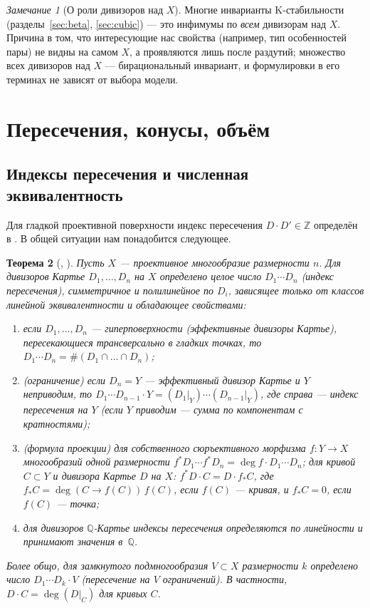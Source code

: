\documentclass[11pt,a4paper]{article}
\theoremstyle{plain}
\newtheorem{theorem}{Теорема}[section]
\theoremstyle{definition}
\theoremstyle{remark}
\newtheorem{remark}[theorem]{Замечание}
\newcommand{\Z}{\mathbb{Z}}
\newcommand{\Q}{\mathbb{Q}}
\begin{document}
\begin{remark}[О роли дивизоров над $X$]
Многие инварианты K-стабильности (разделы~\ref{sec:beta}, \ref{sec:cubic}) --- это инфимумы по
\emph{всем} дивизорам над $X$. Причина в том, что интересующие нас свойства (например, тип
особенностей пары) не видны на самом $X$, а проявляются лишь после раздутий; множество всех
дивизоров над $X$ --- бирациональный инвариант, и формулировки в его терминах не зависят от
выбора модели.
\end{remark}

\section{Пересечения, конусы, объём}\label{sec:cones}

\subsection{Индексы пересечения и численная эквивалентность}

Для гладкой проективной поверхности индекс пересечения $D\cdot D'\in\Z$ определён в
\cite[V.1.1]{Ha}. В общей ситуации нам понадобится следующее.

\begin{theorem}[{\cite[гл.~1]{Fulton}, \cite[I.1]{La}}]\label{thm:intersection-numbers}
Пусть $X$ --- проективное многообразие размерности $n$. Для дивизоров Картье $D_1,\dots,D_n$ на $X$
определено целое число $D_1\cdots D_n$ \textup{(}\emph{индекс пересечения}\textup{)}, симметричное и полилинейное по
$D_i$, зависящее только от классов линейной эквивалентности и обладающее свойствами:
\begin{enumerate}
\item если $D_1,\dots,D_n$ --- гиперповерхности \textup{(}эффективные дивизоры Картье\textup{)}, пересекающиеся
трансверсально в гладких точках, то $D_1\cdots D_n=\#(D_1\cap\dots\cap D_n)$;
\item \textup{(}\emph{ограничение}\textup{)} если $D_n=Y$ --- эффективный дивизор Картье и $Y$ неприводим, то
$D_1\cdots D_{n-1}\cdot Y=(D_1|_Y)\cdots(D_{n-1}|_Y)$, где справа --- индекс пересечения на $Y$
\textup{(}если $Y$ приводим --- сумма по компонентам с кратностями\textup{)};
\item \textup{(}\emph{формула проекции}\textup{)} для собственного сюръективного морфизма $f\colon Y\to X$
многообразий одной размерности $f^*D_1\cdots f^*D_n=\deg f\cdot D_1\cdots D_n$; для кривой
$C\subset Y$ и дивизора Картье $D$ на $X$: $f^*D\cdot C=D\cdot f_*C$, где $f_*C=\deg(C\to f(C))\,f(C)$,
если $f(C)$ --- кривая, и $f_*C=0$, если $f(C)$ --- точка;
\item для дивизоров $\Q$-Картье индексы пересечения определяются по линейности и принимают
значения в~$\Q$.
\end{enumerate}
Более общо, для замкнутого подмногообразия $V\subset X$ размерности $k$ определено число
$D_1\cdots D_k\cdot V$ \textup{(}пересечение на $V$ ограничений\textup{)}. В частности, $D\cdot C=\deg(D|_C)$ для
кривых $C$.
\end{theorem}
\end{document}
